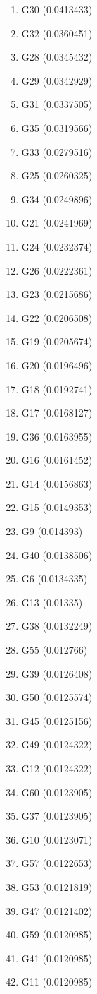\begin{enumerate}
\item G30 (0.0413433)
\item G32 (0.0360451)
\item G28 (0.0345432)
\item G29 (0.0342929)
\item G31 (0.0337505)
\item G35 (0.0319566)
\item G33 (0.0279516)
\item G25 (0.0260325)
\item G34 (0.0249896)
\item G21 (0.0241969)
\item G24 (0.0232374)
\item G26 (0.0222361)
\item G23 (0.0215686)
\item G22 (0.0206508)
\item G19 (0.0205674)
\item G20 (0.0196496)
\item G18 (0.0192741)
\item G17 (0.0168127)
\item G36 (0.0163955)
\item G16 (0.0161452)
\item G14 (0.0156863)
\item G15 (0.0149353)
\item G9 (0.014393)
\item G40 (0.0138506)
\item G6 (0.0134335)
\item G13 (0.01335)
\item G38 (0.0132249)
\item G55 (0.012766)
\item G39 (0.0126408)
\item G50 (0.0125574)
\item G45 (0.0125156)
\item G49 (0.0124322)
\item G12 (0.0124322)
\item G60 (0.0123905)
\item G37 (0.0123905)
\item G10 (0.0123071)
\item G57 (0.0122653)
\item G53 (0.0121819)
\item G47 (0.0121402)
\item G59 (0.0120985)
\item G41 (0.0120985)
\item G11 (0.0120985)

\end{enumerate}
